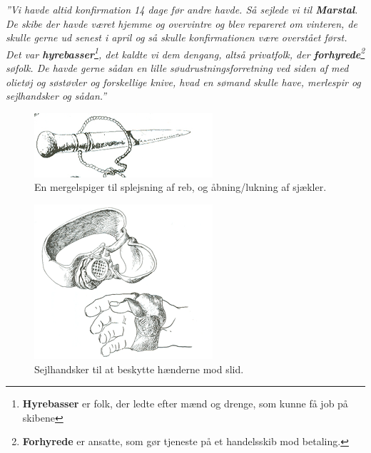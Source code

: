 
\emph{''Vi havde altid konfirmation 14 dage før andre havde. Så sejlede
vi til \textbf{Marstal}. De skibe der havde været hjemme og overvintre
og blev repareret om vinteren, de skulle gerne ud senest i april og så
skulle konfirmationen være overstået først. Det var
\textbf{hyrebasser}\footnote{\textbf{Hyrebasser} er folk, der ledte
  efter mænd og drenge, som kunne få job på skibene}, det kaldte vi dem
dengang, altså privatfolk, der \textbf{forhyrede}\footnote{\textbf{Forhyrede}
  er ansatte, som gør tjeneste på et handelsskib mod betaling.} søfolk.
De havde gerne sådan en lille søudrustningsforretning ved siden af med
olietøj og søstøvler og forskellige knive, hvad en sømand skulle have,
merlespir og sejlhandsker og sådan.''}

\begin{figure}
\centering
\includegraphics{images/sejlskibe_tema-2-merlespige.png}
\caption{En mergelspiger til splejsning af reb, og åbning/lukning af
sjækler.}
\end{figure}

\begin{figure}
\centering
\includegraphics{images/sejlskibe_tema-2-sejlhandsk.png}
\caption{Sejlhandsker til at beskytte hænderne mod slid.}
\end{figure}

